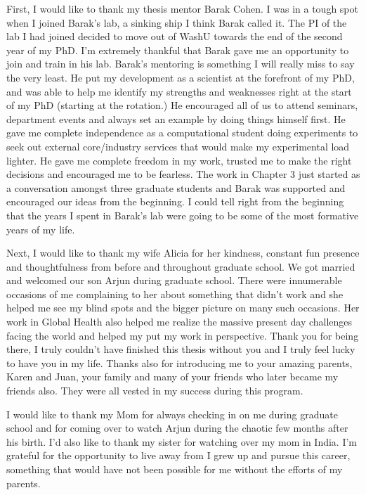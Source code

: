 \thesisacknowledgments

First, I would like to thank my thesis mentor Barak Cohen. I was in a tough spot when I joined Barak's lab, a sinking ship I think Barak called it. The PI of the lab I had joined decided to move out of WashU towards the end of the second year of my PhD. I'm extremely thankful that Barak gave me an opportunity to join and train in his lab. Barak's mentoring is something I will really miss to say the very least. He put my development as a scientist at the forefront of my PhD, and was able to help me identify my strengths and weaknesses right at the start of my PhD (starting at the rotation.) He encouraged all of us to attend seminars, department events and always set an example by doing things himself first. He gave me complete independence as a computational student doing experiments to seek out external core/industry services that would make my experimental load lighter. He gave me complete freedom in my work, trusted me to make the right decisions and encouraged me to be fearless. The work in Chapter 3 just started as a conversation amongst three graduate students and Barak was supported and encouraged our ideas from the beginning. I could tell right from the beginning that the years I spent in Barak's lab were going to be some of the most formative years of my life.

Next, I would like to thank my wife Alicia for her kindness, constant fun presence and thoughtfulness from before and throughout graduate school. We got married and welcomed our son Arjun during graduate school. There were innumerable occasions of me complaining to her about something that didn't work and she helped me see my blind spots and the bigger picture on many such occasions. Her work in Global Health also helped me realize the massive present day challenges facing the world and helped my put my work in perspective. Thank you for being there, I truly couldn't have finished this thesis without you and I truly feel lucky to have you in my life. Thanks also for introducing me to your amazing parents, Karen and Juan, your family and many of your friends who later became my friends also. They were all vested in my success during this program.

I would like to thank my Mom for always checking in on me during graduate school and for coming over to watch Arjun during the chaotic few months after his birth. I'd also like to thank my sister for watching over my mom in India. I'm grateful for the opportunity to live away from I grew up and pursue this career, something that would have not been possible for me without the efforts of my parents.

